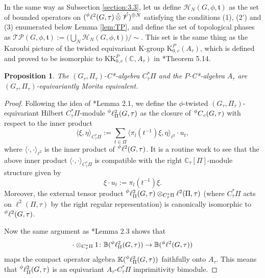 \documentclass[11pt]{amsart}
\theoremstyle{definition}
\theoremstyle{plain}
\newtheorem{prp}[equation]{Proposition}
\theoremstyle{remark}
\newcommand{\bB}{\mathbb{B}}
\newcommand{\bC}{\mathbb{C}}
\newcommand{\bK}{\mathbb{K}}
\newcommand{\cH}{\mathcal{H}}
\newcommand{\ft}{\mathfrak{t}}
\newcommand{\sV}{\mathscr{V}}
\newcommand{\K}{\mathrm{K}}%
\newcommand{\KK}{\mathrm{KK}}%
\DeclareMathOperator{\hotimes}{\hat{\otimes}}
\begin{document}
In the same way as Subsection \ref{section:3.3}, let us define $\cH_N(G,\phi,\ft)$ as the set of bounded operators on $(\prescript{\phi}{}\ell^2(G,\tau ) \hotimes \acute{\sV})^{\oplus N}$ satisfying the conditions (1), (2') and (3) enumerated below Lemma \ref{lem:TP}, and define the set of topological phases as $\mathscr{TP}(G,\phi,\ft):=\big( \bigcup_N \cH_N(G,\phi,\ft)\big) /\sim $.
This set is the same thing as the Karoubi picture of the twisted equivariant K-group $\K_{0,c}^P(A_\tau)$, which is defined and proved to be isomorphic to $\KK_{0,c}^P(\bC, A_\tau)$ in \cite{kubotaNotesTwistedEquivariant2016}*{Theorem 5.14}. 

\begin{prp}\label{prp:irr}
The $(G_\tau,\Pi_\tau)$-C*-algebra $C^*_{\bar{\tau}} \Pi$ and the $P$-C*-algebra $A_\tau$ are $(G_\tau,\Pi_\tau)$-equivariantly Morita equivalent.
\end{prp}
\begin{proof}
Following the idea of \cite{roeComparingAnalyticAssembly2002}*{Lemma 2.1}, we define the $\phi$-twisted $(G_\tau,\Pi_\tau)$-equivariant Hilbert $C^*_{\bar{\tau}}\Pi$-module $\prescript{\phi}{} \ell^2_\Pi(G,\tau )$ as the closure of $\prescript{\phi}{}C_c(G, \tau )$ with respect to the inner product
\[ \langle \xi , \eta \rangle_{C^*_{\bar{\tau}} \Pi} := \sum_{t \in \Pi} \langle  \pi_l(t^{-1}) \xi, \eta \rangle_{\ell^2} \cdot u_t, \]
where $\langle {\cdot },{ \cdot } \rangle _{\ell^2}$ is the inner product of $\prescript{\phi}{}\ell^2(G,\tau )$. It is a routine work to see that the above inner product $\langle \cdot, \cdot \rangle_{C^*_{\bar{\tau}}\Pi}$ is compatible with the right $\bC_{\bar{\tau}}[\Pi]$-module structure given by 
\[ \xi \cdot u_t:=\pi_l(t^{-1}) \xi.\] 
Moreover, the external tensor product $\prescript{\phi}{} \ell^2_\Pi(G, \tau) \otimes_{C^*_{\bar{\tau}} \Pi} \ell^2(\Pi, \tau)$ (where $C^*_{\bar{\tau}}\Pi$ acts on $\ell^2(\Pi, \tau)$ by the right regular representation) is canonically isomorphic to $\prescript{\phi}{}{\ell}^2(G,\tau)$. 

Now the same argument as \cite{roeComparingAnalyticAssembly2002}*{Lemma 2.3} shows that 
\[{\cdot }\otimes_{C^*_{\bar{\tau}} \Pi} 1 \colon \bB(\prescript{\phi}{} \ell^2_\Pi(G,\tau )) \to \bB(\prescript{\phi}{} \ell^2(G,\tau ))\]
maps the compact operator algebra $\bK(\prescript{\phi}{} \ell^2_\Pi(G,\tau))$ faithfully onto $A_\tau$. 
This means that $\prescript{\phi}{} \ell^2_\Pi(G,\tau)$ is an equivariant $A_\tau$-$C^*_{\bar{\tau}}\Pi$ imprimitivity bimodule.
\end{proof}
\end{document}
